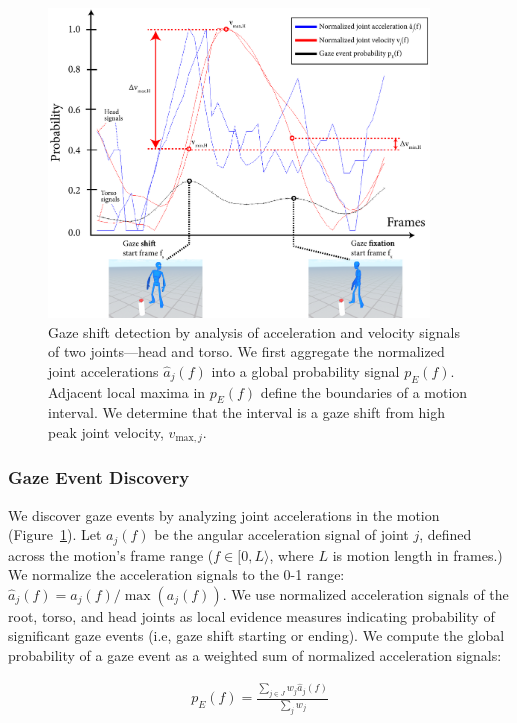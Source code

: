\begin{figure}
\centering
\includegraphics[width=0.9\textwidth]{gazeauthoring/Figures/GazeInstanceInference.pdf}
\caption{Gaze shift detection by analysis of acceleration and velocity signals of two joints---head and torso. We first aggregate the normalized joint accelerations $\hat{a}_j(f)$ into a global probability signal $p_E(f)$. Adjacent local maxima in $p_E(f)$ define the boundaries of a motion interval. We determine that the interval is a gaze shift from high peak joint velocity, $v_{\mathrm{max},j}$.}
\label{fig:GazeInstanceInference}
\end{figure}

\subsubsection{Gaze Event Discovery}

We discover gaze events by analyzing joint accelerations in the motion (Figure~\ref{fig:GazeInstanceInference}). Let $a_j(f)$ be the angular acceleration signal of joint $j$, defined across the motion's frame range ($f \in [0, L\rangle$, where $L$ is motion length in frames.) We normalize the acceleration signals to the 0-1 range: $\hat{a}_j(f) = a_j(f) / \mathop{max}(a_j(f))$. We use normalized acceleration signals of the root, torso, and head joints as local evidence measures indicating probability of significant gaze events (i.e, gaze shift starting or ending). We compute the global probability of a gaze event as a weighted sum of normalized acceleration signals:

\begin{align} \label{eq:GazeEventProbability}
p_E(f) = \frac{\sum_{j \in J} w_j \hat{a}_j(f)}{\sum_j w_j}
\end{align}

